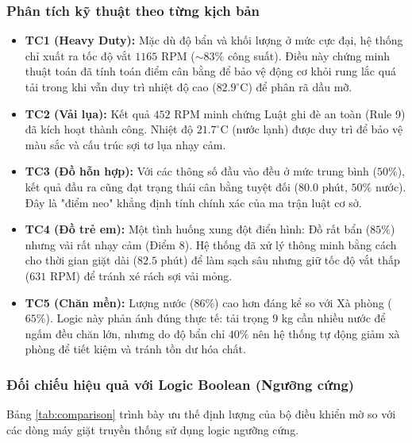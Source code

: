 \documentclass[12pt, a4paper]{article}
\begin{document}
\subsubsection{Phân tích kỹ thuật theo từng kịch bản}
\begin{itemize}
    \item \textbf{TC1 (Heavy Duty):} Mặc dù độ bẩn và khối lượng ở mức cực đại, hệ thống chỉ xuất ra tốc độ vắt $1165$ RPM ($\sim 83\%$ công suất). Điều này chứng minh thuật toán đã tính toán điểm cân bằng để bảo vệ động cơ khỏi rung lắc quá tải trong khi vẫn duy trì nhiệt độ cao ($82.9^\circ$C) để phân rã dầu mỡ.
    \item \textbf{TC2 (Vải lụa):} Kết quả $452$ RPM minh chứng Luật ghi đè an toàn (Rule 9) đã kích hoạt thành công. Nhiệt độ $21.7^\circ$C (nước lạnh) được duy trì để bảo vệ màu sắc và cấu trúc sợi tơ lụa nhạy cảm.
    \item \textbf{TC3 (Đồ hỗn hợp):} Với các thông số đầu vào đều ở mức trung bình ($50\%$), kết quả đầu ra cũng đạt trạng thái cân bằng tuyệt đối ($80.0$ phút, $50\%$ nước). Đây là "điểm neo" khẳng định tính chính xác của ma trận luật cơ sở.
    \item \textbf{TC4 (Đồ trẻ em):} Một tình huống xung đột điển hình: Đồ rất bẩn ($85\%$) nhưng vải rất nhạy cảm (Điểm 8). Hệ thống đã xử lý thông minh bằng cách cho thời gian giặt dài ($82.5$ phút) để làm sạch sâu nhưng giữ tốc độ vắt thấp ($631$ RPM) để tránh xé rách sợi vải mỏng.
    \item \textbf{TC5 (Chăn mền):} Lượng nước ($86\%$) cao hơn đáng kể so với Xà phòng ($65\%$). Logic này phản ánh đúng thực tế: tải trọng $9$ kg cần nhiều nước để ngấm đều chăn lớn, nhưng do độ bẩn chỉ $40\%$ nên hệ thống tự động giảm xà phòng để tiết kiệm và tránh tồn dư hóa chất.
\end{itemize}

\subsubsection{Đối chiếu hiệu quả với Logic Boolean (Ngưỡng cứng)}
Bảng \ref{tab:comparison} trình bày ưu thế định lượng của bộ điều khiển mờ so với các dòng máy giặt truyền thống sử dụng logic ngưỡng cứng.

\begin{table}[H]
    \centering
    \caption{Ước tính hiệu quả của Logic mờ so với Logic Boolean}
    \label{tab:comparison}
\end{table}
\end{document}
